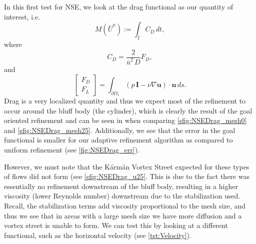 \begin{test} \label{tst:Drag}
    In this first test for NSE, we look at the drag functional as our quantity
    of interest, i.e.
    \begin{equation}
        M(\bar{U}^n) := \int_I\! C_D\, dt,
        \label{eq:DragFunctional}
    \end{equation}
    where
    \begin{equation*}
        C_D = \frac{2}{\bar{u}^2\, D}F_D,
    \end{equation*}
    and
    \begin{equation*}
        \begin{bmatrix} F_D \\ F_L \end{bmatrix} =
            \int_{\partial \Omega_1}\! (p\, \mathbf{I} - \nu \nabla
                \mathbf{u})\cdot \mathbf{n}\, ds.
    \end{equation*}
    Drag is a very localized quantity and thus we expect most of the refinement
    to occur around the bluff body (the cylinder), which is clearly the result
    of the goal oriented refinement and can be seen in when comparing
    \autoref{sfig:NSEDrag_mesh0} and \autoref{sfig:NSEDrag_mesh25}.
    Additionally, we see that the error in the goal functional is smaller for
    our adaptive refinement algorithm as compared to uniform refinement (see
    \autoref{fig:NSEDrag_err}).

    However, we must note that the K\'arm\'an Vortex Street expected for these
    types of flows did not form (see \autoref{sfig:NSEDrag_u25}. This is due to
    the fact there was essentially no refinement downstream of the bluff body,
    resulting in a higher viscosity (lower Reynolds number) downstream due to
    the stabilization used. Recall, the stabilization terms add viscosity
    proportional to the mesh size, and thus we see that in areas with a large
    mesh size we have more diffusion and a vortex street is unable to form. We
    can test this by looking at a different functional, such as the horizontal
    velocity (see \autoref{tst:Velocity}).


\end{test}
